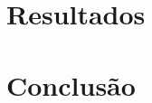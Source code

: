 \documentclass[
	12pt,				%
	openright,			%
	twoside,			%
	a4paper,			%
	english,			%
	brazil				%
	]{abntex2}
\begin{document}
\chapter{Resultados}
\chapter{Conclusão}

\lipsum[31-33]

\postextual


\end{document}
